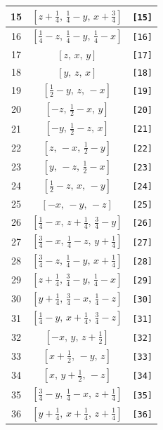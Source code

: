 \documentclass[fleqn,8pt]{jsarticle}
\begin{document}
\begin{longtable}{ccc}
15 & $\left[ z + \frac{1}{4},\, \frac{1}{4} - y,\, x + \frac{3}{4} \right]$ & {\tt [15]} \\ \hline
16 & $\left[ \frac{1}{4} - z,\, \frac{1}{4} - y,\, \frac{1}{4} - x \right]$ & {\tt [16]} \\ \hline
17 & $\left[ z,\, x,\, y \right]$ & {\tt [17]} \\ \hline
18 & $\left[ y,\, z,\, x \right]$ & {\tt [18]} \\ \hline
19 & $\left[ \frac{1}{2} - y,\, z,\, - x \right]$ & {\tt [19]} \\ \hline
20 & $\left[ - z,\, \frac{1}{2} - x,\, y \right]$ & {\tt [20]} \\ \hline
21 & $\left[ - y,\, \frac{1}{2} - z,\, x \right]$ & {\tt [21]} \\ \hline
22 & $\left[ z,\, - x,\, \frac{1}{2} - y \right]$ & {\tt [22]} \\ \hline
23 & $\left[ y,\, - z,\, \frac{1}{2} - x \right]$ & {\tt [23]} \\ \hline
24 & $\left[ \frac{1}{2} - z,\, x,\, - y \right]$ & {\tt [24]} \\ \hline
25 & $\left[ - x,\, - y,\, - z \right]$ & {\tt [25]} \\ \hline
26 & $\left[ \frac{1}{4} - x,\, z + \frac{1}{4},\, \frac{3}{4} - y \right]$ & {\tt [26]} \\ \hline
27 & $\left[ \frac{3}{4} - x,\, \frac{1}{4} - z,\, y + \frac{1}{4} \right]$ & {\tt [27]} \\ \hline
28 & $\left[ \frac{3}{4} - z,\, \frac{1}{4} - y,\, x + \frac{1}{4} \right]$ & {\tt [28]} \\ \hline
29 & $\left[ z + \frac{1}{4},\, \frac{3}{4} - y,\, \frac{1}{4} - x \right]$ & {\tt [29]} \\ \hline
30 & $\left[ y + \frac{1}{4},\, \frac{3}{4} - x,\, \frac{1}{4} - z \right]$ & {\tt [30]} \\ \hline
31 & $\left[ \frac{1}{4} - y,\, x + \frac{1}{4},\, \frac{3}{4} - z \right]$ & {\tt [31]} \\ \hline
32 & $\left[ - x,\, y,\, z + \frac{1}{2} \right]$ & {\tt [32]} \\ \hline
33 & $\left[ x + \frac{1}{2},\, - y,\, z \right]$ & {\tt [33]} \\ \hline
34 & $\left[ x,\, y + \frac{1}{2},\, - z \right]$ & {\tt [34]} \\ \hline
35 & $\left[ \frac{3}{4} - y,\, \frac{1}{4} - x,\, z + \frac{1}{4} \right]$ & {\tt [35]} \\ \hline
36 & $\left[ y + \frac{1}{4},\, x + \frac{1}{4},\, z + \frac{1}{4} \right]$ & {\tt [36]} \\ \hline

\end{longtable}
\end{document}
